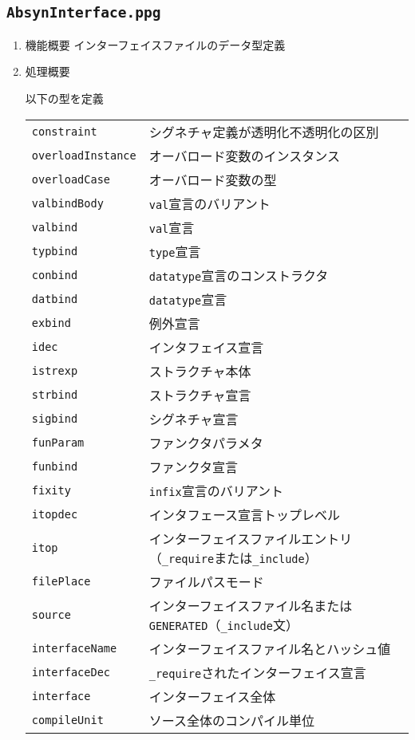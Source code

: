 \documentclass{jbook}
\newcommand{\code}[1]{\mbox{\large\tt #1}}
\begin{document}
\subsection{\code{AbsynInterface.ppg}}
\begin{enumerate}
\item 機能概要 インターフェイスファイルのデータ型定義
\item 処理概要 

以下の型を定義

\begin{tabular}{ll}
\code{constraint} & シグネチャ定義が透明化不透明化の区別\\
\code{overloadInstance} & オーバロード変数のインスタンス\\
\code{overloadCase} & オーバロード変数の型\\
\code{valbindBody} & \code{val}宣言のバリアント\\
\code{valbind} & \code{val}宣言\\
\code{typbind} & \code{type}宣言\\
\code{conbind} & \code{datatype}宣言のコンストラクタ\\
\code{datbind} & \code{datatype}宣言\\
\code{exbind} & 例外宣言\\
\code{idec} & インタフェイス宣言\\
\code{istrexp} & ストラクチャ本体\\
\code{strbind} & ストラクチャ宣言\\
\code{sigbind} & シグネチャ宣言\\
\code{funParam} & ファンクタパラメタ\\
\code{funbind} & ファンクタ宣言\\
\code{fixity}  & \code{infix}宣言のバリアント\\
\code{itopdec} & インタフェース宣言トップレベル\\
\code{itop}  & インターフェイスファイルエントリ（\code{\_require}または\code{\_include}）\\
\code{filePlace} & ファイルパスモード\\
\code{source} & インターフェイスファイル名または\code{GENERATED}（\code{\_include}文）\\
\code{interfaceName} & インターフェイスファイル名とハッシュ値\\
\code{interfaceDec} & \code{\_require}されたインターフェイス宣言\\
\code{interface} & インターフェイス全体\\
\code{compileUnit} & ソース全体のコンパイル単位
\end{tabular}
\end{enumerate}
\end{document}
